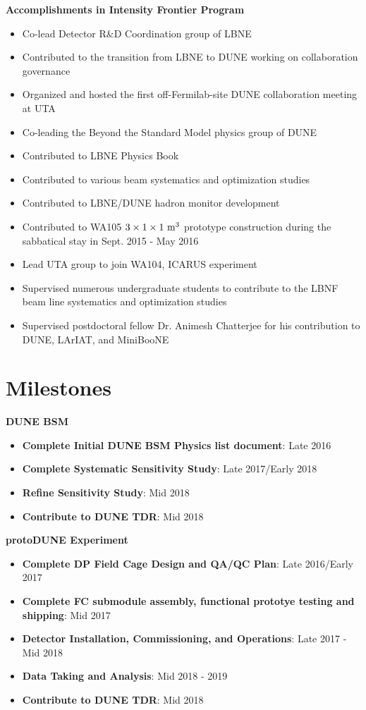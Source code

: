 \noindent\textbf{Accomplishments in Intensity Frontier Program}
\begin{itemize}[noitemsep,nolistsep]
\item{Co-lead Detector R$\&$D Coordination group of LBNE}
\item{Contributed to the transition from LBNE to DUNE working on collaboration governance}
\item{Organized and hosted the first off-Fermilab-site DUNE collaboration meeting at UTA}
\item{Co-leading the Beyond the Standard Model physics group of DUNE}
\item{Contributed to LBNE Physics Book}
\item{Contributed to various beam systematics and optimization studies}
\item{Contributed to LBNE/DUNE hadron monitor development}
\item{Contributed to WA105 $3\times 1 \times 1~{\rm m^{3}}$ prototype construction during the sabbatical stay in Sept. 2015 - May 2016}
\item{Lead UTA group to join WA104, ICARUS experiment}
\item {Supervised numerous undergraduate students to contribute to the LBNF beam line systematics and optimization studies}
\item {Supervised postdoctoral fellow Dr. Animesh Chatterjee for his contribution to DUNE, LArIAT, and MiniBooNE}
\end{itemize}

\section*{\textbf{Milestones}}
\noindent\textbf{DUNE BSM}
\begin{itemize}[noitemsep,nolistsep]
\item{\textbf{Complete Initial DUNE BSM Physics list document}}: Late 2016
\item{\textbf{Complete Systematic Sensitivity Study}}: Late 2017/Early 2018
\item{\textbf{Refine Sensitivity Study}}: Mid 2018
\item{\textbf{Contribute to DUNE TDR}}: Mid 2018
\end{itemize}

\noindent\textbf{protoDUNE Experiment}
\begin{itemize}[noitemsep,nolistsep]
\item{\textbf{Complete DP Field Cage Design and QA/QC Plan}}: Late 2016/Early 2017
\item{\textbf{Complete FC submodule assembly, functional prototye testing and shipping}}: Mid 2017
\item{\textbf{Detector Installation, Commissioning, and Operations}}: Late 2017 - Mid 2018
\item{\textbf{Data Taking and Analysis}}: Mid 2018 - 2019
\item{\textbf{Contribute to DUNE TDR}}: Mid 2018
\end{itemize}

